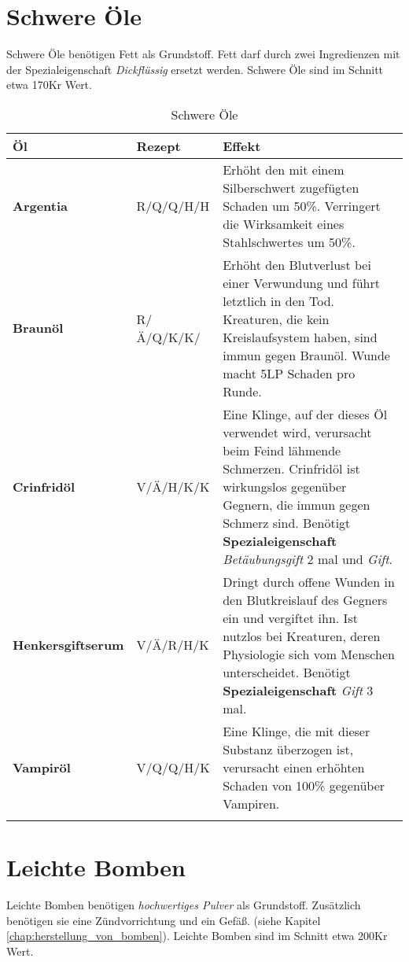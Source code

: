 \section{Schwere Öle}
Schwere Öle benötigen Fett als Grundstoff. Fett darf durch zwei Ingredienzen mit der Spezialeigenschaft \textit{Dickflüssig} ersetzt werden. Schwere Öle sind im Schnitt etwa 170Kr Wert.

\begin{longtable}{|p{4cm}|p{}|p{9cm}|}
\hline
\textbf{Öl} & \textbf{Rezept} & \textbf{Effekt} \\ \hline

\textbf{Argentia} & R/Q/Q/H/H & Erhöht den mit einem Silberschwert zugefügten Schaden um 50\%. Verringert die Wirksamkeit eines Stahlschwertes um 50\%. \\ \hline

\textbf{Braunöl} & R/Ä/Q/K/K/ & Erhöht den Blutverlust bei einer Verwundung und führt letztlich in den Tod. Kreaturen, die kein Kreislaufsystem haben, sind immun gegen Braunöl. Wunde macht 5LP Schaden pro Runde. \\ \hline

\textbf{Crinfridöl} & V/Ä/H/K/K & Eine Klinge, auf der dieses Öl verwendet wird, verursacht beim Feind lähmende Schmerzen. Crinfridöl ist wirkungslos gegenüber Gegnern, die immun gegen Schmerz sind. Benötigt \textbf{Spezialeigenschaft} \textit{Betäubungsgift} 2 mal und \textit{Gift}. \\ \hline

\textbf{Henkersgiftserum} & V/Ä/R/H/K & Dringt durch offene Wunden in den Blutkreislauf des Gegners ein und vergiftet ihn. Ist nutzlos bei Kreaturen, deren Physiologie sich vom Menschen unterscheidet. Benötigt \textbf{Spezialeigenschaft} \textit{Gift} 3 mal. \\ \hline

\textbf{Vampiröl} & V/Q/Q/H/K & Eine Klinge, die mit dieser Substanz überzogen ist, verursacht einen erhöhten Schaden von 100\% gegenüber Vampiren.  \\ \hline

\caption{Schwere Öle}
\label{tab:schwere_oele}
\end{longtable}



\section{Leichte Bomben}
Leichte Bomben benötigen \textit{hochwertiges Pulver} als Grundstoff. Zusätzlich benötigen sie eine Zündvorrichtung und ein Gefäß. (siehe Kapitel \ref{chap:herstellung_von_bomben}). Leichte Bomben sind im Schnitt etwa 200Kr Wert.

